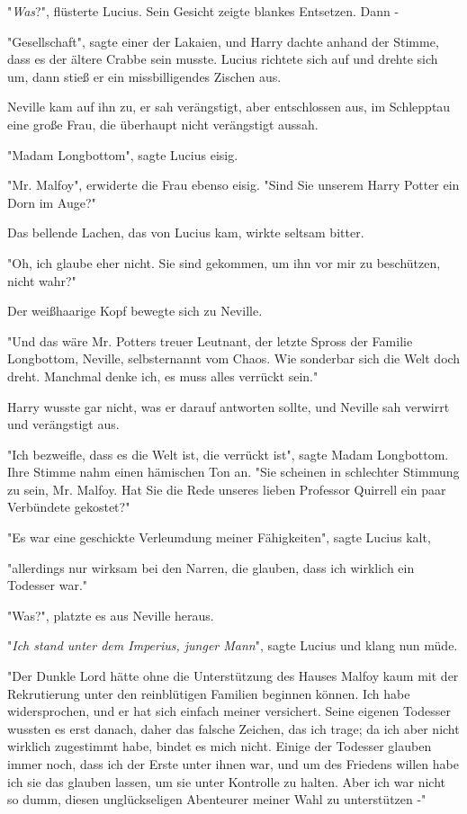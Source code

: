 {"\emph{Was}?", flüsterte Lucius. Sein Gesicht zeigte blankes Entsetzen. Dann -

"Gesellschaft", sagte einer der Lakaien, und Harry dachte anhand der Stimme, dass es der ältere Crabbe sein musste. Lucius richtete sich auf und drehte sich um, dann stieß er ein missbilligendes Zischen aus.

Neville kam auf ihn zu, er sah verängstigt, aber entschlossen aus, im Schlepptau eine große Frau, die überhaupt nicht verängstigt aussah.

"Madam Longbottom", sagte Lucius eisig.

"Mr. Malfoy", erwiderte die Frau ebenso eisig. "Sind Sie unserem Harry Potter ein Dorn im Auge?"

Das bellende Lachen, das von Lucius kam, wirkte seltsam bitter.

"Oh, ich glaube eher nicht. Sie sind gekommen, um ihn vor mir zu beschützen, nicht wahr?"

Der weißhaarige Kopf bewegte sich zu Neville.

"Und das wäre Mr. Potters treuer Leutnant, der letzte Spross der Familie Longbottom, Neville, selbsternannt vom Chaos. Wie sonderbar sich die Welt doch dreht. Manchmal denke ich, es muss alles verrückt sein."

Harry wusste gar nicht, was er darauf antworten sollte, und Neville sah verwirrt und verängstigt aus.

"Ich bezweifle, dass es die Welt ist, die verrückt ist", sagte Madam Longbottom. Ihre Stimme nahm einen hämischen Ton an. "Sie scheinen in schlechter Stimmung zu sein, Mr. Malfoy. Hat Sie die Rede unseres lieben Professor Quirrell ein paar Verbündete gekostet?"

"Es war eine geschickte Verleumdung meiner Fähigkeiten", sagte Lucius kalt,

"allerdings nur wirksam bei den Narren, die glauben, dass ich wirklich ein Todesser war."

"Was?", platzte es aus Neville heraus.

"\emph{Ich stand unter dem Imperius, junger Mann}", sagte Lucius und klang nun müde.

"Der Dunkle Lord hätte ohne die Unterstützung des Hauses Malfoy kaum mit der Rekrutierung unter den reinblütigen Familien beginnen können. Ich habe widersprochen, und er hat sich einfach meiner versichert. Seine eigenen Todesser wussten es erst danach, daher das falsche Zeichen, das ich trage; da ich aber nicht wirklich zugestimmt habe, bindet es mich nicht. Einige der Todesser glauben immer noch, dass ich der Erste unter ihnen war, und um des Friedens willen habe ich sie das glauben lassen, um sie unter Kontrolle zu halten. Aber ich war nicht so dumm, diesen unglückseligen Abenteurer meiner Wahl zu unterstützen -"

}
